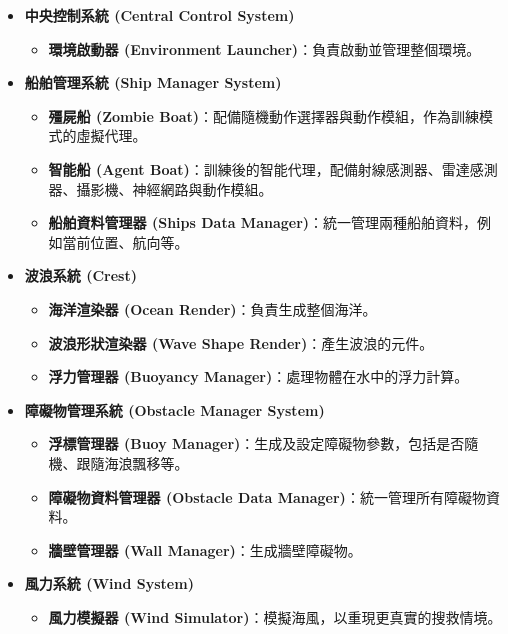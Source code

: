 \documentclass[12pt,a4paper]{ctexart}
\begin{document}
\begin{itemize}
	 \item \textbf{中央控制系統 (Central Control System)}
	\begin{itemize}
	    \item \textbf{環境啟動器 (Environment Launcher)}：負責啟動並管理整個環境。
	\end{itemize}
	
	 \item \textbf{船舶管理系統 (Ship Manager System)}
	\begin{itemize}
	    \item \textbf{殭屍船 (Zombie Boat)}：配備隨機動作選擇器與動作模組，作為訓練模式的虛擬代理。
	    \item \textbf{智能船 (Agent Boat)}：訓練後的智能代理，配備射線感測器、雷達感測器、攝影機、神經網路與動作模組。
	    \item \textbf{船舶資料管理器 (Ships Data Manager)}：統一管理兩種船舶資料，例如當前位置、航向等。
	\end{itemize}
	
	 \item \textbf{波浪系統 (Crest)}
	\begin{itemize}
	    \item \textbf{海洋渲染器 (Ocean Render)}：負責生成整個海洋。
	    \item \textbf{波浪形狀渲染器 (Wave Shape Render)}：產生波浪的元件。
	    \item \textbf{浮力管理器 (Buoyancy Manager)}：處理物體在水中的浮力計算。
	\end{itemize}
	
	 \item \textbf{障礙物管理系統 (Obstacle Manager System)}
	\begin{itemize}
	    \item \textbf{浮標管理器 (Buoy Manager)}：生成及設定障礙物參數，包括是否隨機、跟隨海浪飄移等。
	    \item \textbf{障礙物資料管理器 (Obstacle Data Manager)}：統一管理所有障礙物資料。
	    \item \textbf{牆壁管理器 (Wall Manager)}：生成牆壁障礙物。
	\end{itemize}
	
	 \item \textbf{風力系統 (Wind System)}
	\begin{itemize}
	    \item \textbf{風力模擬器 (Wind Simulator)}：模擬海風，以重現更真實的搜救情境。
	\end{itemize}
	

\end{itemize}
\end{document}
